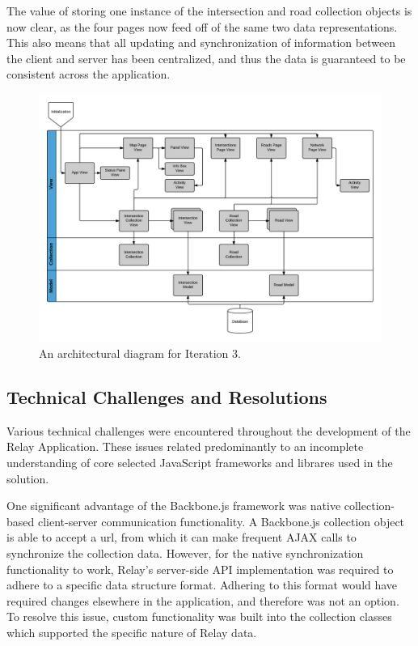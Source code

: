 \documentclass{report}
\begin{document}
The value of storing one instance of the intersection and road collection objects is now clear, as the four pages now feed off of the same two data representations. This also means that all updating and synchronization of information between the client and server has been centralized, and thus the data is guaranteed to be consistent across the application.

\begin{figure}[htbp!]
  \begin{centering}
    \includegraphics[scale=0.25]{figures/Iteration-3.png}
    \caption{An architectural diagram for Iteration 3.}
    \label{fig:iteration3}
  \end{centering}
\end{figure}

\subsection{Technical Challenges and Resolutions}

Various technical challenges were encountered throughout the development of the Relay Application. These issues related predominantly to an incomplete understanding of core selected JavaScript frameworks and librares used in the solution.

One significant advantage of the Backbone.js framework was native collection-based client-server communication functionality. A Backbone.js collection object is able to accept a url, from which it can make frequent AJAX calls to synchronize the collection data. However, for the native synchronization functionality to work, Relay's server-side API implementation was required to adhere to a specific data structure format. Adhering to this format would have required changes elsewhere in the application, and therefore was not an option. To resolve this issue, custom functionality was built into the collection classes which supported the specific nature of Relay data.
\end{document}
